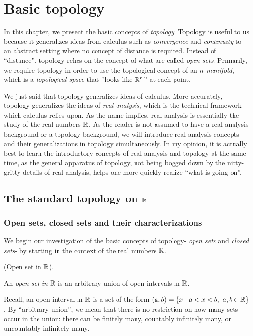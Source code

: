 \chapter{Basic topology}
\label{ch::topology}

In this chapter, we present the basic concepts of \textit{topology}. Topology is useful to us because it generalizes ideas from calculus such as \textit{convergence} and \textit{continuity} to an abstract setting where no concept of distance is required. Instead of ``distance'', topology relies on the concept of what are called \textit{open sets}. Primarily, we require topology in order to use the topological concept of an \textit{$n$-manifold}, which is a \textit{topological space} that ``looks like $\mathbb{R}^n$'' at each point.

We just said that topology generalizes ideas of calculus. More accurately, topology generalizes the ideas of \textit{real analysis}, which is the technical framework which calculus relies upon. As the name implies, real analysis is essentially the study of the real numbers $\mathbb{R}$. As the reader is not assumed to have a real analysis background or a topology background, we will introduce real analysis concepts and their generalizations in topology simultaneously. In my opinion, it is actually best to learn the introductory concepts of real analysis and topology at the same time, as the general apparatus of topology, not being bogged down by the nitty-gritty details of real analysis, helps one more quickly realize ``what is going on''.

\section*{The standard topology on $\mathbb{R}$}

\subsection*{Open sets, closed sets and their characterizations}

We begin our investigation of the basic concepts of topology- \textit{open sets} and \textit{closed sets}- by starting in the context of the real numbers $\mathbb{R}$.

\begin{defn}
    (Open set in $\mathbb{R}$).
    
    An \textit{open set in $\mathbb{R}$} is an arbitrary union of open intervals in $\mathbb{R}$.
    
    Recall, an open interval in $\mathbb{R}$ is a set of the form $(a, b) = \{ x \mid a < x < b, \text{ } a, b \in \mathbb{R} \}$. By ``arbitrary union'', we mean that there is no restriction on how many sets occur in the union: there can be finitely many, countably infinitely many, or uncountably infinitely many.
\end{defn}

